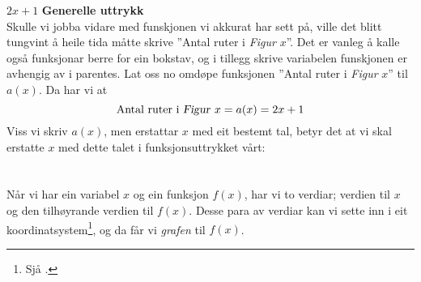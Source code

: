 \st{$ {2x+1} $}
\newpage
\textbf{Generelle uttrykk} \\
Skulle vi jobba vidare med funskjonen vi akkurat har sett på, ville det blitt tungvint å heile tida måtte skrive ''Antal ruter i \textsl{Figur }$ x $''. Det er vanleg å kalle også funksjonar berre for ein bokstav, og i tillegg skrive variabelen funskjonen er avhengig av i parentes. Lat oss no omdøpe funksjonen ''Antal ruter i \textsl{Figur} $ x $'' til $ a(x) $. Da har vi at
\[ \text{Antal ruter i \textsl{Figur }}x=a(x)=2x+1 \]
Viss vi skriv $ a(x) $, men erstattar $ x $ med eit bestemt tal, betyr det at vi skal erstatte $ x $ med dette talet i funksjonsuttrykket vårt:
\newpage
{}
\section{\lingraf}
Når vi har ein variabel $ x $ og ein funksjon $ f(x)  $, har vi to verdiar; verdien til $ x $ og den tilhøyrande verdien til $ f(x) $. Desse para av verdiar kan vi sette inn i eit koordinatsystem\footnote{Sjå .}, og da får vi \textit{grafen} til $ f(x) $. \vsk

